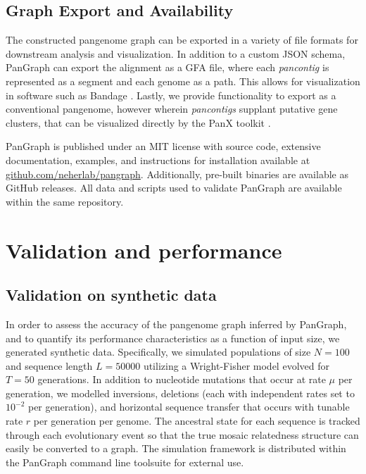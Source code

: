 \documentclass[aps,rmp,reprint,superscriptaddress,notitlepage,10pt]{revtex4-1}
\begin{document}
\subsection{Graph Export and Availability}
The constructed pangenome graph can be exported in a variety of file formats for downstream analysis and visualization.
In addition to a custom JSON schema, PanGraph can export the alignment as a GFA file, where each \emph{pancontig} is represented as a segment and each genome as a path.
This allows for visualization in software such as Bandage \cite{wick2015bandage}.
Lastly, we provide functionality to export as a conventional pangenome, however wherein \emph{pancontigs} supplant putative gene clusters, that can be visualized directly by the PanX toolkit \cite{ding2018panx}.

PanGraph is published under an MIT license with source code, extensive documentation, examples, and instructions for installation available at \url{github.com/neherlab/pangraph}.
Additionally, pre-built binaries are available as GitHub releases.
All data and scripts used to validate PanGraph are available within the same repository.

\section{Validation and performance}

\subsection{Validation on synthetic data}

In order to assess the accuracy of the pangenome graph inferred by PanGraph, and to quantify its performance characteristics as a function of input size, we generated synthetic data.
Specifically, we simulated populations of size $N=100$ and sequence length $L=50000$ utilizing a Wright-Fisher model \cite{hudson2002generating} evolved for $T=50$ generations.
In addition to nucleotide mutations that occur at rate $\mu$ per generation, we modelled inversions, deletions (each with independent rates set to $10^{-2}$ per generation), and horizontal sequence transfer that occurs with tunable rate $r$ per generation per genome.
The ancestral state for each sequence is tracked through each evolutionary event so that the true mosaic relatedness structure can easily be converted to a graph.
The simulation framework is distributed within the PanGraph command line toolsuite for external use.
\end{document}
